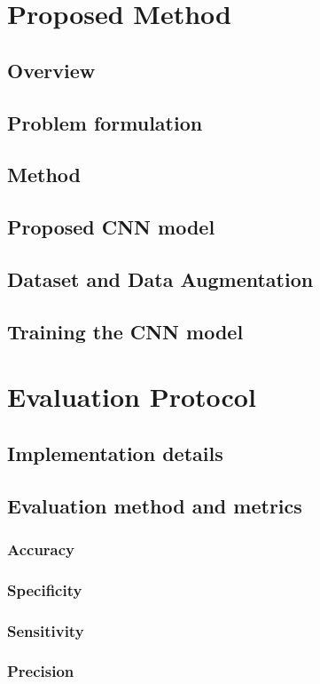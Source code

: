 \documentclass[12pt, oneside]{article}   	%
\begin{document}
\newpage
\section{Proposed Method}
\subsection{Overview}
\subsection{Problem formulation}
\subsection{Method}
\subsection{Proposed CNN model}
\subsection{Dataset and Data Augmentation}
\subsection{Training the CNN model}



\newpage
\section{Evaluation Protocol}
\subsection{Implementation details}
\subsection{Evaluation method and metrics}
\subsubsection{Accuracy}
\subsubsection{Specificity}
\subsubsection{Sensitivity}
\subsubsection{Precision}
\end{document}
